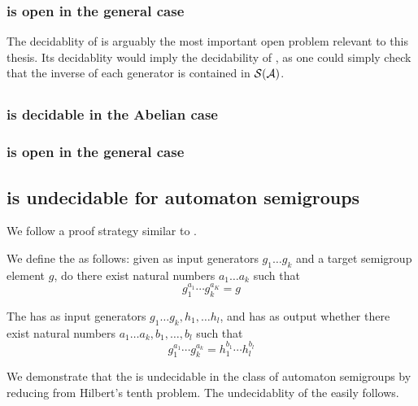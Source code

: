 \documentclass[11pt, titlepage]{article}
\begin{document}
\subsubsection{ is open in the general case}

The decidablity of  is arguably the most important
open problem relevant to this thesis. Its decidablity would imply the
decidability of , as one could simply check that the
inverse of each generator is contained in $\mathcal{S}(\mathcal{A})$.

\subsection{}
\subsubsection{ is decidable in the Abelian case}
\subsubsection{ is open in the general case}

\subsection{ is undecidable for automaton semigroups}
We follow a proof strategy similar to \cite{Konig15:knapsack}.


\begin{definition}
  We define the  as follows: given as input
  generators $g_1 \ldots g_k$ and a target semigroup element $g$, do
  there exist natural numbers $a_1\ldots a_k$ such that
  \[ g_1^{a_1} \cdots g_k^{a_K} = g \]
\end{definition}

\begin{definition}
  The  has as input generators
  $g_1 \ldots g_k, h_1, \ldots h_l$, and has as output whether there
  exist natural numbers $a_1\ldots a_k, b_1, \ldots, b_l$ such that
  \[ g_1^{a_1} \cdots g_k^{a_k} = h_1^{b_1} \cdots h_l^{b_l} \]
\end{definition}

We demonstrate that the  is
undecidable in the class of automaton semigroups by reducing from
Hilbert's tenth problem. The undecidablity of the  easily follows.
\end{document}
